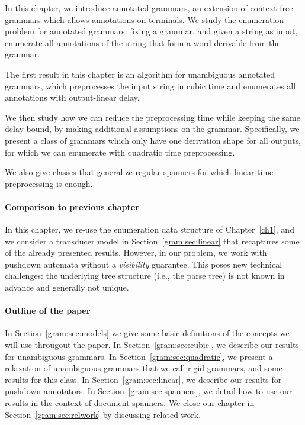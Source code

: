 In this chapter, we introduce annotated grammars, an extension of context-free grammars which allows annotations on terminals. We study the enumeration problem for annotated grammars: fixing a grammar, and given a string as input, enumerate all annotations of the string that form a word derivable from the grammar. 

The first result in this chapter is an algorithm for unambiguous annotated grammars, which preprocesses the input string in cubic time and enumerates all annotations with output-linear delay. 

We then study how we can reduce the preprocessing time while keeping the same delay bound, by making additional assumptions on the grammar. Specifically, we present a class of grammars which only have one derivation shape for all outputs, for which we can enumerate with quadratic time preprocessing. 

We also give classes that generalize regular spanners for which linear time preprocessing is enough.

%

\paragraph{Comparison to previous chapter}
In this chapter, we re-use the
enumeration data structure of Chapter~\ref{ch1}, and we consider a transducer model in
Section~\ref{gram:sec:linear} that recaptures some of the already presented results. 
However, in our
problem, we work with pushdown automata without a {\em visibility} guarantee. This poses new technical
challenges: the underlying tree structure (i.e., the parse tree) is not known in
advance and generally not unique.

\paragraph{Outline of the paper}
In Section~\ref{gram:sec:models} we give some basic definitions of the concepts we will use througout the paper. In Section~\ref{gram:sec:cubic}, we describe our results for unambiguous grammars. In Section~\ref{gram:sec:quadratic}, we present a relaxation of unambiguous grammars that we call rigid grammars, and some results for this class. In Section~\ref{gram:sec:linear}, we describe our results for pushdown annotators. In Section~\ref{gram:sec:spanners}, we detail how to use our results in the context of document spanners. We close our chapter in Section~\ref{gram:sec:relwork} by discussing related work.

